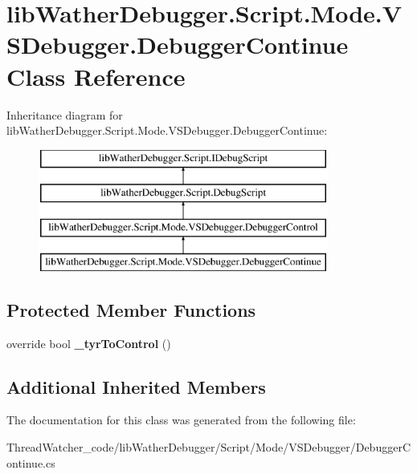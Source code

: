 \hypertarget{classlib_wather_debugger_1_1_script_1_1_mode_1_1_v_s_debugger_1_1_debugger_continue}{\section{lib\+Wather\+Debugger.\+Script.\+Mode.\+V\+S\+Debugger.\+Debugger\+Continue Class Reference}
\label{classlib_wather_debugger_1_1_script_1_1_mode_1_1_v_s_debugger_1_1_debugger_continue}
}
Inheritance diagram for lib\+Wather\+Debugger.\+Script.\+Mode.\+V\+S\+Debugger.\+Debugger\+Continue\+:\begin{figure}[H]
\begin{center}
\leavevmode
\includegraphics[height=4.000000cm]{classlib_wather_debugger_1_1_script_1_1_mode_1_1_v_s_debugger_1_1_debugger_continue}
\end{center}
\end{figure}
\subsection*{Protected Member Functions}
\begin{DoxyCompactItemize}
\item 
\hypertarget{classlib_wather_debugger_1_1_script_1_1_mode_1_1_v_s_debugger_1_1_debugger_continue_aaf6d1d75dfbeeebc561db269fa571ca0}{override bool {\bfseries \+\_\+tyr\+To\+Control} ()}\label{classlib_wather_debugger_1_1_script_1_1_mode_1_1_v_s_debugger_1_1_debugger_continue_aaf6d1d75dfbeeebc561db269fa571ca0}

\end{DoxyCompactItemize}
\subsection*{Additional Inherited Members}


The documentation for this class was generated from the following file\+:\begin{DoxyCompactItemize}
\item 
Thread\+Watcher\+\_\+code/lib\+Wather\+Debugger/\+Script/\+Mode/\+V\+S\+Debugger/Debugger\+Continue.\+cs\end{DoxyCompactItemize}
